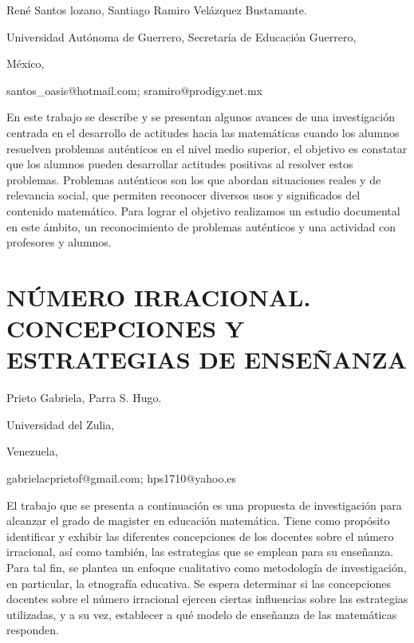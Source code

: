\begin{datos}

René Santos lozano, Santiago Ramiro Velázquez Bustamante.

Universidad Autónoma de Guerrero, Secretaría de Educación Guerrero,

México,

santos\_oasis@hotmail.com; sramiro@prodigy.net.mx 

\end{datos}

En este trabajo se describe y se presentan algunos avances de una
investigación centrada en el desarrollo de actitudes hacia las matemáticas
cuando los alumnos resuelven problemas auténticos en el nivel medio
superior, el objetivo es constatar que los alumnos pueden desarrollar
actitudes positivas al resolver estos problemas. Problemas auténticos
son los que abordan situaciones reales y de relevancia social, que
permiten reconocer diversos usos y significados del contenido matemático.
Para lograr el objetivo realizamos un estudio documental en este ámbito,
un reconocimiento de problemas auténticos y una actividad con profesores
y alumnos.


\section{NÚMERO IRRACIONAL. CONCEPCIONES Y ESTRATEGIAS DE ENSEÑANZA}

\begin{datos}

Prieto Gabriela, Parra S. Hugo.

Universidad del Zulia,

Venezuela,

gabrielacprietof@gmail.com; hps1710@yahoo.es 

\end{datos}

El trabajo que se presenta a continuación es una propuesta de investigación
para alcanzar el grado de magister en educación matemática. Tiene
como propósito identificar y exhibir las diferentes concepciones de
los docentes sobre el número irracional, así como también, las estrategias
que se emplean para su enseñanza. Para tal fin, se plantea un enfoque
cualitativo como metodología de investigación, en particular, la etnografía
educativa. Se espera determinar si las concepciones docentes sobre
el número irracional ejercen ciertas influencias sobre las estrategias
utilizadas, y a su vez, establecer a qué modelo de enseñanza de las
matemáticas responden.


